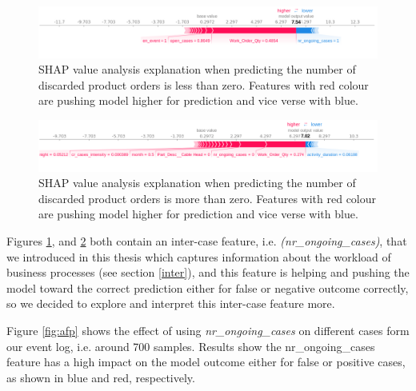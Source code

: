 \begin{figure}[!htbp]
	\includegraphics[width=\linewidth]{images/shap/false_force_plot_sc.png}
	\caption[SHAP force plot product (false outcome)]{SHAP value analysis explanation when predicting the number of discarded product orders is less than zero. Features with red colour are pushing model higher for prediction and vice verse with blue.}
	\label{fig:ffp}
\end{figure}\hspace*{\fill}

\begin{figure}[!htbp]
	\includegraphics[width=\linewidth]{images/shap/true_fp.png}
	\caption[SHAP force plot product (true outcome)]{SHAP value analysis explanation when predicting the number of discarded product orders is more than zero. Features with red colour are pushing model higher for prediction and vice verse with blue.}
	\label{fig:tfp}
\end{figure}\hspace*{\fill}

Figures \ref{fig:ffp}, and \ref{fig:tfp} both contain an inter-case feature, i.e. \textit{(nr\_ongoing\_cases)},  that we introduced in this thesis which captures information about the workload of business processes (see section \ref{inter}), and this feature is helping and pushing the model toward the correct prediction either for false or negative outcome correctly, so we decided to explore and interpret this inter-case feature more. 

Figure \ref{fig:afp} shows the effect of using \textit{nr\_ongoing\_cases} on different cases form our event log, i.e. around 700 samples. Results show the nr\_ongoing\_cases feature has a high impact on the model outcome either for false or positive cases, as shown in blue and red, respectively. 

